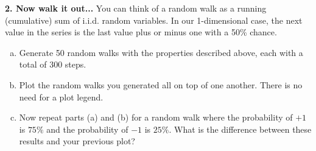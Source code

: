 \documentclass[11pt]{article}
\begin{document}
\noindent
\newline
\textbf{2. Now walk it out...}
You can think of a random walk as a running (cumulative) sum of
i.i.d. random variables. In our 1-dimensional case,
the next value in the series is the last value plus or minus one with a 50\%
chance.
    
\begin{enumerate}[a.]
    \item  Generate 50 random walks with the properties described above,
    each with a total of 300 steps.
    
    \item  Plot the random walks you generated all on top of one another.
    There is no need for a plot legend.
    
    \item  Now repeat parts (a) and (b) for a random walk where the
    probability of $+1$ is $75\%$ and the probability of $-1$ is $25\%$.
    What is the difference between these results and your previous plot?
\end{enumerate}
\end{document}
